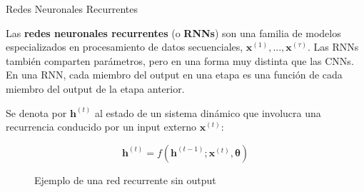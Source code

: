 \documentclass[9pt]{beamer}
\begin{document}
\begin{frame}{Redes Neuronales Recurrentes}

Las \textbf{redes neuronales recurrentes} (o \textbf{RNNs}) son una familia de modelos especializados en procesamiento de datos secuenciales, $\bm{x}^{(1)},...,\bm{x}^{(\tau)}$. Las RNNs también comparten parámetros, pero en una forma muy distinta que las CNNs. En una RNN, cada miembro del output en una etapa es una función de cada miembro del output de la etapa anterior. \pause

Se denota por $\bm{h}^{(t)}$ al estado de un sistema din\'amico que involucra una recurrencia conducido por un input externo $\bm{x}^{(t)}$:

\begin{equation*}
\bm{h}^{(t)} = f(\bm{h}^{(t-1)}; \bm{x}^{(t)}, \bm{\theta})
\end{equation*}
\pause

\begin{figure}[H]
\captionsetup{font=small,labelfont=small}
\caption{Ejemplo de una red recurrente sin output \cite{Goodfellow-et-al-2016}}
\centering
{}
\end{figure}

\end{frame}
\end{document}

